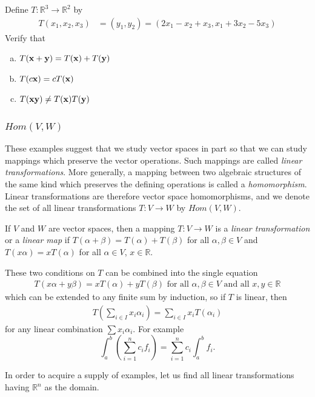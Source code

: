 \documentclass[12pt,letterpaper,reqno]{article}
\numberwithin{equation}{section}
\newcommand{\ti}[1]{\textit{#1}}
\begin{document}
\begin{exercise}
Define $T:\mathbb{R}^3 \to \mathbb{R}^2$ by
\begin{align*}
T(x_1,x_2,x_3)&=(y_1,y_2)=(2x_1-x_2+x_3,x_1+3x_2-5x_3)
\end{align*}
Verify that
\begin{enumerate}[(a)]
	\item $T({\bf x}+{\bf y})=T({\bf x})+T({\bf y})$
	\item $T(c{\bf x})=cT({\bf x})$
	\item $T({\bf xy}) \neq T({\bf x})T({\bf y})$
\end{enumerate}	
\end{exercise}

\subsubsection{$Hom(V,W)$}

These examples suggest that we study vector spaces in part so that we can study mappings which preserve the vector operations. Such mappings are called \ti{linear transformations}. More generally, a mapping between two algebraic structures of the same kind which preserves the defining operations is called a \ti{homomorphism}. Linear transformations are therefore vector space homomorphisms, and we denote the set of all linear transformations $T:V \to W$ by $Hom(V,W)$.

\begin{defn}
If $V$ and $W$ are vector spaces, then a mapping $T:V \to W$ is a \ti{linear transformation} or a \ti{linear map} if $T(\alpha+\beta)=T(\alpha)+T(\beta)$ for all $\alpha,\beta \in V$ and $T(x\alpha)=xT(\alpha)$ for all $\alpha \in V$, $x \in \mathbb{R}$. 	
\end{defn}

These two conditions on $T$ can be combined into the single equation
\begin{align*}
	T(x\alpha+y\beta)=xT(\alpha)+yT(\beta) \text{ for all } \alpha,\beta \in V \text{ and all } x,y \in \mathbb{R}
\end{align*}
which can be extended to any finite sum by induction, so if $T$ is linear, then
\begin{align*}
	T(\sum_{i \in I}x_i\alpha_i)=\sum_{i \in I}x_i T(\alpha_i)
\end{align*}
for any linear combination $\sum x_i\alpha_i$. For example $$\int_a^b (\sum_{i=1}^n c_if_i)=\sum_{i=1}^nc_i \int_a^b f_i.$$

In order to acquire a supply of examples, let us find all linear transformations having $\mathbb{R}^n$ as the domain. 
\end{document}
